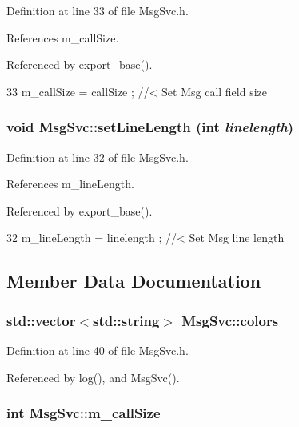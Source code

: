Definition at line 33 of file MsgSvc.h.

References m\_\-callSize.

Referenced by export\_\-base().


\begin{DoxyCode}
33 { m_callSize   = callSize  ; } //< Set Msg call field size
\end{DoxyCode}
\hypertarget{classMsgSvc_ab741c391e80fcbf13eb2e60e48dc7536}{
\subsubsection[{setLineLength}]{\setlength{\rightskip}{0pt plus 5cm}void MsgSvc::setLineLength (int {\em linelength})}}
\label{classMsgSvc_ab741c391e80fcbf13eb2e60e48dc7536}


Definition at line 32 of file MsgSvc.h.

References m\_\-lineLength.

Referenced by export\_\-base().


\begin{DoxyCode}
32 { m_lineLength = linelength ; } //< Set Msg line length
\end{DoxyCode}


\subsection{Member Data Documentation}
\hypertarget{classMsgSvc_abcd0a0eab83f97f7638bbcca4f69e950}{
\subsubsection[{colors}]{\setlength{\rightskip}{0pt plus 5cm}std::vector$<$std::string$>$ {\bf MsgSvc::colors}}}
\label{classMsgSvc_abcd0a0eab83f97f7638bbcca4f69e950}


Definition at line 40 of file MsgSvc.h.

Referenced by log(), and MsgSvc().\hypertarget{classMsgSvc_ab22aa5d8130cbb94246c4192440d41fb}{
\subsubsection[{m\_\-callSize}]{\setlength{\rightskip}{0pt plus 5cm}int {\bf MsgSvc::m\_\-callSize}}}
\label{classMsgSvc_ab22aa5d8130cbb94246c4192440d41fb}


